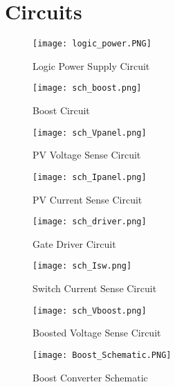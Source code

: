 
\chapter{Circuits} %

\label{AppendixB} %


\begin{figure}[h]
\centering
\texttt{[image: logic\_power.PNG]}
\caption{Logic Power Supply Circuit}
\label{logic power fig}
\end{figure}


\begin{figure}[h]
\centering
\texttt{[image: sch\_boost.png]}
\caption{Boost Circuit}
\label{Figure E}
\end{figure}

\begin{figure}[h]
\centering
\texttt{[image: sch\_Vpanel.png]}
\caption{PV Voltage Sense Circuit}
\label{Figure F}
\end{figure}

\begin{figure}[h]
\centering
\texttt{[image: sch\_Ipanel.png]}
\caption{PV Current Sense Circuit}
\label{Figure G}
\end{figure}

\begin{figure}[h]
\centering
\texttt{[image: sch\_driver.png]}
\caption{ Gate Driver Circuit}
\label{Figure H}
\end{figure}

\begin{figure}[h]
\centering
\texttt{[image: sch\_Isw.png]}
\caption{Switch Current Sense Circuit}
\label{Figure I}
\end{figure}

\begin{figure}[h]
\centering
\texttt{[image: sch\_Vboost.png]}
\caption{Boosted Voltage Sense Circuit}
\label{Figure J}
\end{figure}

\begin{figure}[h]
\centering
\texttt{[image: Boost\_Schematic.PNG]}
\caption{Boost Converter Schematic}
\label{Figure 6}
\end{figure}

